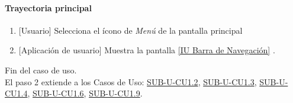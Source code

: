 \paragraph{Trayectoria principal}
	\begin{enumerate}
		\item {[Usuario]} Selecciona el ícono de \textit{Menú} de la pantalla principal %
		\item {[Aplicación de usuario]} Muestra la pantalla \hyperref[fig:Barra de navegacion]{[IU Barra de Navegación]} .
	\end{enumerate}
	Fin del caso de uso.\\
	El paso 2 extiende a los Casos de Uso: \hyperref[SUB-U-CU1.2]{SUB-U-CU1.2}, \hyperref[SUB-U-CU1.3]{SUB-U-CU1.3}, \hyperref[SUB-U-CU1.4]{SUB-U-CU1.4},
	\hyperref[SUB-U-CU1.6]{SUB-U-CU1.6},
	\hyperref[SUB-U-CU1.9]{SUB-U-CU1.9}.
	
	
	

